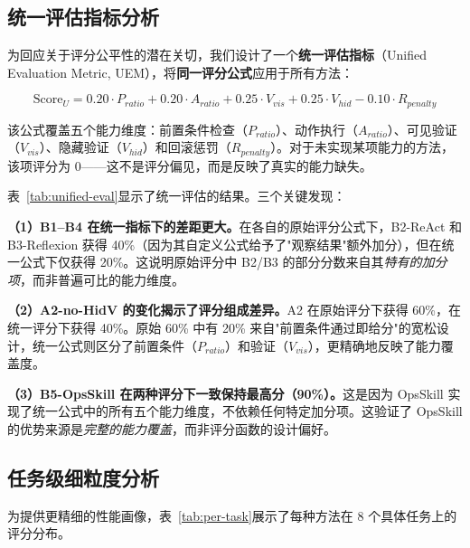 \documentclass[11pt,a4paper]{ctexart}
\begin{document}
\subsection{统一评估指标分析}

为回应关于评分公平性的潜在关切，我们设计了一个\textbf{统一评估指标}（Unified Evaluation Metric, UEM），将\textbf{同一评分公式}应用于所有方法：

\begin{equation}
\text{Score}_{U} = 0.20 \cdot P_{ratio} + 0.20 \cdot A_{ratio} + 0.25 \cdot V_{vis} + 0.25 \cdot V_{hid} - 0.10 \cdot R_{penalty}
\end{equation}

\noindent 该公式覆盖五个能力维度：前置条件检查（$P_{ratio}$）、动作执行（$A_{ratio}$）、可见验证（$V_{vis}$）、隐藏验证（$V_{hid}$）和回滚惩罚（$R_{penalty}$）。对于未实现某项能力的方法，该项评分为 0——这不是评分偏见，而是反映了真实的能力缺失。



表~\ref{tab:unified-eval}显示了统一评估的结果。三个关键发现：

\textbf{（1）B1--B4 在统一指标下的差距更大。}在各自的原始评分公式下，B2-ReAct 和 B3-Reflexion 获得 40\%（因为其自定义公式给予了"观察结果"额外加分），但在统一公式下仅获得 20\%。这说明原始评分中 B2/B3 的部分分数来自其\emph{特有的加分项}，而非普遍可比的能力维度。

\textbf{（2）A2-no-HidV 的变化揭示了评分组成差异。}A2 在原始评分下获得 60\%，在统一评分下获得 40\%。原始 60\% 中有 20\% 来自"前置条件通过即给分"的宽松设计，统一公式则区分了前置条件（$P_{ratio}$）和验证（$V_{vis}$），更精确地反映了能力覆盖度。

\textbf{（3）B5-OpsSkill 在两种评分下一致保持最高分（90\%）。}这是因为 OpsSkill 实现了统一公式中的所有五个能力维度，不依赖任何特定加分项。这验证了 OpsSkill 的优势来源是\emph{完整的能力覆盖}，而非评分函数的设计偏好。

\subsection{任务级细粒度分析}

为提供更精细的性能画像，表~\ref{tab:per-task}展示了每种方法在 8 个具体任务上的评分分布。
\end{document}
